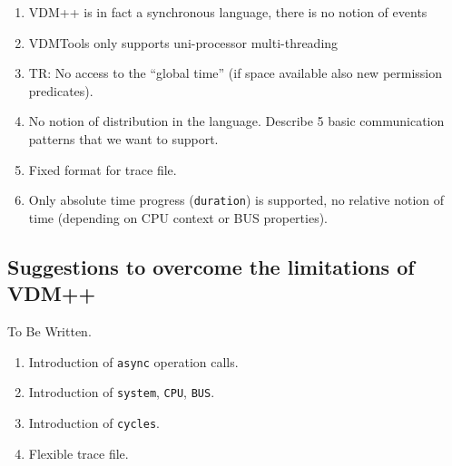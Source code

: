\begin{enumerate}
\item VDM++ is in fact a synchronous language, there is no notion of events
\item VDMTools only supports uni-processor multi-threading
\item \textsc{TR:} No access to the ``global time'' (if space available also
new permission predicates).
\item No notion of distribution in the language. Describe 5 basic communication
patterns that we want to support.
\item Fixed format for trace file.
\item Only absolute time progress (\texttt{duration}) is supported, no relative
notion of time (depending on CPU context or BUS properties).
\end{enumerate}

\subsection{Suggestions to overcome the limitations of VDM++}
\label{subsec:vdmppnew}

\noindent To Be Written.

\begin{enumerate}
\item Introduction of \texttt{async} operation calls.
\item Introduction of \texttt{system}, \texttt{CPU}, \texttt{BUS}.
\item Introduction of \texttt{cycles}.
\item Flexible trace file.
\end{enumerate}
